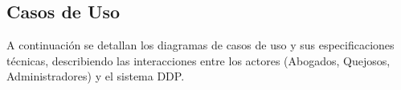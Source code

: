 
\begin{appendices}

\chapter{Casos de Uso}
\label{anexo:casos_uso}

A continuación se detallan los diagramas de casos de uso y sus especificaciones técnicas, describiendo las interacciones entre los actores (Abogados, Quejosos, Administradores) y el sistema DDP.














\end{appendices}